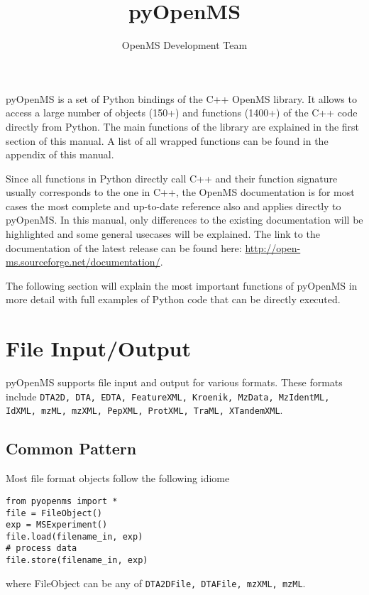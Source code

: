 \documentclass[10pt]{article}
\title{pyOpenMS }
\author{OpenMS Development Team}
\date{}
\begin{document}
  \maketitle

  pyOpenMS is a set of Python bindings of the C++ OpenMS library. It allows to
  access a large number of objects (150+) and functions (1400+) of the C++
  code directly from Python. 
  The main functions of the library are explained in the first section of this
  manual. A list of all wrapped functions can be found in the appendix of this
  manual.

  Since all functions in Python directly call C++ and their function signature
  usually corresponds to the one in C++, the OpenMS documentation is for most
  cases the most complete and up-to-date reference also and applies directly
  to pyOpenMS. In this manual, only differences to the existing documentation
  will be highlighted and some general usecases will be explained. The link to
  the documentation of the latest release can be found here:
  \url{http://open-ms.sourceforge.net/documentation/}.

  \tableofcontents

  \pagebreak

  The following section will explain the most important functions of pyOpenMS
  in more detail with full examples of Python code that can be directly
  executed.

  \section{File Input/Output}

  pyOpenMS supports file input and output for various formats. These formats
  include \texttt{DTA2D, DTA, EDTA, FeatureXML, Kroenik, MzData, MzIdentML, IdXML, mzML,
  mzXML, PepXML, ProtXML, TraML, XTandemXML}.

\subsection{Common Pattern}

Most file format objects follow the following idiome

\begin{verbatim}
from pyopenms import *
file = FileObject() 
exp = MSExperiment() 
file.load(filename_in, exp)
# process data
file.store(filename_in, exp)
\end{verbatim}

where FileObject can be any of \texttt{DTA2DFile, DTAFile, mzXML, mzML}.
\end{document}
